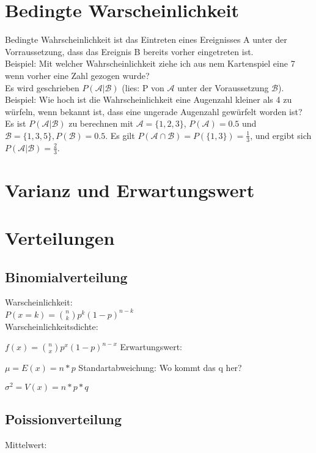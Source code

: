 \documentclass[a4paper, 11pt]{article}
\begin{document}
\section{Bedingte Warscheinlichkeit}
Bedingte Wahrscheinlichkeit ist das Eintreten eines Ereignisses A unter der
Vorraussetzung, dass das Ereignis B bereits vorher eingetreten ist. \\
Beispiel: Mit welcher Wahrscheinlichkeit ziehe ich aus nem Kartenspiel eine 7
wenn vorher eine Zahl gezogen wurde? \\
Es wird geschrieben $P(\mathcal{A}|\mathcal{B})$ (lies: P von $\mathcal{A}$
unter der Voraussetzung $\mathcal{B}$). \\
Beispiel: Wie hoch ist die Wahrscheinlichkeit eine Augenzahl kleiner als 4 zu
würfeln, wenn bekannt ist, dass eine ungerade Augenzahl gewürfelt worden ist? \\
Es ist $P(\mathcal{A}|\mathcal{B})$ zu berechnen mit $\mathcal{A} = \{1,2,3\}$,
$P(\mathcal{A})= 0.5$ und $\mathcal{B} = \{ 1,3,5\},
P(\mathcal{B})=0.5$.
Es gilt $P(\mathcal{A}\cap \mathcal{B}) = P(\{ 1,3\}) =
\frac{1}{3}$, und ergibt sich $P(\mathcal{A}|\mathcal{B})= \frac{2}{3}$.
\section{Varianz und Erwartungswert}
\section{Verteilungen}
\subsection{Binomialverteilung}
Warscheinlichkeit:\\
$P(x=k) = \binom{n}{k} p^k (1-p)^{n-k}$ \\
Warscheinlichkeitsdichte:

$f(x) = \binom{n}{x} p^x(1-p)^{n-x}$
\newline\newline Erwartungswert:

$\mu = E(x) = n * p$
\newline\newline Standartabweichung:
Wo kommt das q her?

$\sigma^2 = V(x)= n * p * q$
\subsection{Poissionverteilung}
Mittelwert:
\end{document}
